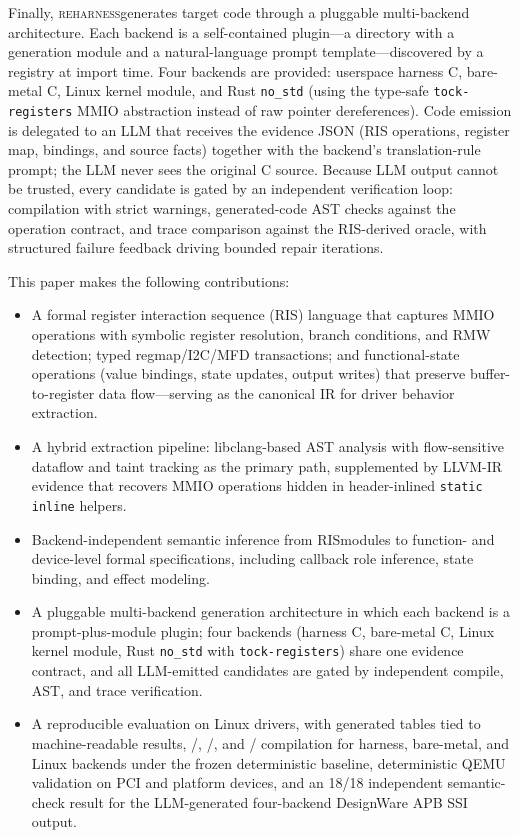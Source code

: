 \documentclass[sigplan, screen, review, anonymous]{acmart}
\newcommand{\reharness}{\textsc{reharness}}
\newcommand{\rislang}{RIS}
\begin{document}
Finally, \reharness generates target code through a pluggable multi-backend architecture. Each backend is a self-contained plugin---a directory with a generation module and a natural-language prompt template---discovered by a registry at import time. Four backends are provided: userspace harness C, bare-metal C, Linux kernel module, and Rust \texttt{no\_std} (using the type-safe \texttt{tock-registers} MMIO abstraction instead of raw pointer dereferences). Code emission is delegated to an LLM that receives the evidence JSON (RIS operations, register map, bindings, and source facts) together with the backend's translation-rule prompt; the LLM never sees the original C source. Because LLM output cannot be trusted, every candidate is gated by an independent verification loop: compilation with strict warnings, generated-code AST checks against the operation contract, and trace comparison against the RIS-derived oracle, with structured failure feedback driving bounded repair iterations.

This paper makes the following contributions:

\begin{itemize}
\item A formal register interaction sequence (\rislang) language that captures MMIO operations with symbolic register resolution, branch conditions, and RMW detection; typed regmap/I2C/MFD transactions; and functional-state operations (value bindings, state updates, output writes) that preserve buffer-to-register data flow---serving as the canonical IR for driver behavior extraction.
\item A hybrid extraction pipeline: libclang-based AST analysis with flow-sensitive dataflow and taint tracking as the primary path, supplemented by LLVM-IR evidence that recovers MMIO operations hidden in header-inlined \texttt{static inline} helpers.
\item Backend-independent semantic inference from \rislang modules to function- and device-level formal specifications, including callback role inference, state binding, and effect modeling.
\item A pluggable multi-backend generation architecture in which each backend is a prompt-plus-module plugin; four backends (harness C, bare-metal C, Linux kernel module, Rust \texttt{no\_std} with \texttt{tock-registers}) share one evidence contract, and all LLM-emitted candidates are gated by independent compile, AST, and trace verification.
\item A reproducible evaluation on \EvalDrivers{} Linux drivers, with generated tables tied to machine-readable results, \HarnessCompileCount{}/\EvalDrivers{}, \BaremetalCompileCount{}/\EvalDrivers{}, and \LinuxCompileCount{}/\EvalDrivers{} compilation for harness, bare-metal, and Linux backends under the frozen deterministic baseline, deterministic QEMU validation on PCI and platform devices, and an 18/18 independent semantic-check result for the LLM-generated four-backend DesignWare APB SSI output.
\end{itemize}
\end{document}
